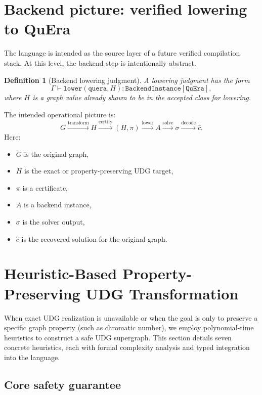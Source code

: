 \documentclass[11pt]{article}
\newtheorem{definition}{Definition}
\begin{document}
\section{Backend picture: verified lowering to QuEra}

The language is intended as the source layer of a future verified compilation stack. At this level, the backend step is intentionally abstract.

\begin{definition}[Backend lowering judgment]
A lowering judgment has the form
\[
\Gamma \vdash \texttt{lower}(\texttt{quera},H) : \texttt{BackendInstance}[\texttt{QuEra}],
\]
where $H$ is a graph value already shown to be in the accepted class for lowering.
\end{definition}

The intended operational picture is:
\[
G
\xrightarrow{\text{transform}}
H
\xrightarrow{\text{certify}}
(H,\pi)
\xrightarrow{\text{lower}}
A
\xrightarrow{\text{solve}}
\sigma
\xrightarrow{\text{decode}}
\widehat{c}.
\]
Here:
\begin{itemize}
    \item $G$ is the original graph,
    \item $H$ is the exact or property-preserving UDG target,
    \item $\pi$ is a certificate,
    \item $A$ is a backend instance,
    \item $\sigma$ is the solver output,
    \item $\widehat{c}$ is the recovered solution for the original graph.
\end{itemize}

\newpage

\section{Heuristic-Based Property-Preserving UDG Transformation}

When exact UDG realization is unavailable or when the goal is only to preserve a specific graph property (such as chromatic number), we employ polynomial-time heuristics to construct a safe UDG supergraph. This section details seven concrete heuristics, each with formal complexity analysis and typed integration into the language.

\subsection{Core safety guarantee}
\end{document}
